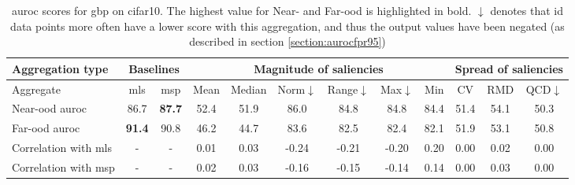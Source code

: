 \documentclass[UKenglish]{uiomasterthesis} %
\theoremstyle{definition}
\begin{document}
\begin{table}[H]
\setlength\tabcolsep{4pt}
\begin{center}
\begin{tabular}{ |m{5em}|c c|c c c c c c|c c c| }
    \hline
     Aggregation type & \multicolumn{2}{c|}{Baselines} & \multicolumn{6}{c|}{Magnitude of saliencies} & \multicolumn{3}{c|}{Spread of saliencies} \\
    \hline
    Aggregate & \ac{mls} & \ac{msp} & Mean & Median & Norm$\downarrow$ & Range$\downarrow$ & Max$\downarrow$ & Min & CV & RMD & QCD$\downarrow$  \\
    \hline
    \rowcolor{near!50}
    Near-\ac{ood} \ac{auroc} & 86.7 &\textbf{ 87.7 }& 52.4 & 51.9 & 86.0 & 84.8 & 84.8 & 84.4 & 51.4 & 54.1 & 50.3  \\
    \hline
    \rowcolor{far!50}
    Far-\ac{ood} \ac{auroc} &\textbf{ 91.4 }& 90.8 & 46.2 & 44.7 & 83.6 & 82.5 & 82.4 & 82.1 & 51.9 & 53.1 & 50.8  \\
    \hline
    Correlation with \ac{mls}& - & - & 0.01 & 0.03 & -0.24 & -0.21 & -0.20 & 0.20 & 0.00 & 0.02 & 0.00  \\
    \hline
    Correlation with \ac{msp}& - & - & 0.02 & 0.03 & -0.16 & -0.15 & -0.14 & 0.14 & 0.00 & 0.03 & 0.00  \\
    \hline
    \end{tabular}
    \caption{\ac{auroc} scores for gbp on cifar10. The highest value for Near- and Far-\ac{ood} is highlighted in bold. $\downarrow$ denotes that \ac{id} data points more often have a lower score with this aggregation, and thus the output values have been negated (as described in section \ref{section:aurocfpr95})}
    \label{table:cifar10_gbp_metrics}
\end{center}
\setlength\tabcolsep{6pt}
\end{table}

%
%
%
\end{document}
